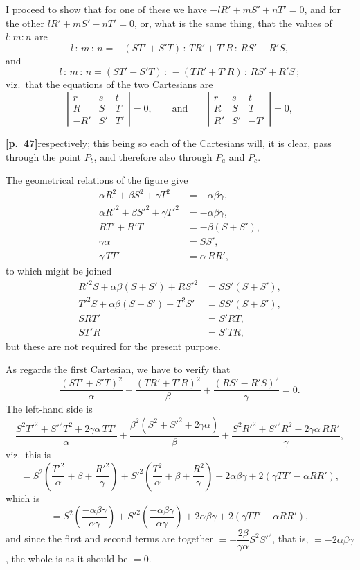 \documentclass[11pt,a4paper]{article}
\begin{document}
I proceed to show that for one of these we have $-lR' + mS' + nT' = 0$, and for the other $lR' + mS' - nT' = 0$, or, what is the same thing, that the values of $l:m:n$ are
\[
l\,:\,m\,:\,n = -(ST' + S'T)\,:\,TR' + T'R\,:\,RS' - R'S,
\]
and
\[
l\,:\,m\,:\,n = (ST' - S'T)\,:\,-(TR' + T'R)\,:\,RS' + R'S\,;
\]
viz.\ that the equations of the two Cartesians are
\[
\left|\begin{array}{ccc} r & s & t \\ R & S & T \\ -R' & S' & T' \end{array}\right| = 0,\qquad\text{and}\qquad
\left|\begin{array}{ccc} r & s & t \\ R & S & T \\ R' & S' & -T' \end{array}\right| = 0,
\]

\bigskip

\noindent\textbf{[p.~47]}\quad respectively; this being so each of the Cartesians will, it is clear, pass through the point $P_{b}$, and therefore also through $P_{a}$ and $P_{c}$.

The geometrical relations of the figure give
\begin{align*}
\alpha R^{2} + \beta S^{2} + \gamma T^{2} &= -\alpha\beta\gamma, \\
\alpha R'^{2} + \beta S'^{2} + \gamma T'^{2} &= -\alpha\beta\gamma, \\
RT' + R'T &= -\beta(S + S'), \\
\gamma\alpha &= SS', \\
\gamma\, TT' &= \alpha\, RR',
\end{align*}
to which might be joined
\begin{align*}
R'^{2}S + \alpha\beta(S + S') + RS'^{2} &= SS'(S + S'), \\
T'^{2}S + \alpha\beta(S + S') + T^{2}S' &= SS'(S + S'), \\
SRT' &= S'RT, \\
ST'R &= S'TR,
\end{align*}
but these are not required for the present purpose.

As regards the first Cartesian, we have to verify that
\[
\frac{(ST' + S'T)^{2}}{\alpha} + \frac{(TR' + T'R)^{2}}{\beta} + \frac{(RS' - R'S)^{2}}{\gamma} = 0.
\]
The left-hand side is
\[
\frac{S^{2}T'^{2} + S'^{2}T^{2} + 2\gamma\alpha\,TT'}{\alpha}
+ \frac{\beta^{2}(S^{2} + S'^{2} + 2\gamma\alpha)}{\beta}
+ \frac{S^{2}R'^{2} + S'^{2}R^{2} - 2\gamma\alpha\,RR'}{\gamma},
\]
viz.\ this is
\[
= S^{2}\!\left(\frac{T'^{2}}{\alpha} + \beta + \frac{R'^{2}}{\gamma}\right)
+ S'^{2}\!\left(\frac{T^{2}}{\alpha} + \beta + \frac{R^{2}}{\gamma}\right)
+ 2\alpha\beta\gamma + 2(\gamma TT' - \alpha RR'),
\]
which is
\[
= S^{2}\!\left(\frac{-\alpha\beta\gamma}{\alpha\gamma}\right) + S'^{2}\!\left(\frac{-\alpha\beta\gamma}{\alpha\gamma}\right) + 2\alpha\beta\gamma + 2(\gamma TT' - \alpha RR'),
\]
and since the first and second terms are together $= -\dfrac{2\beta}{\gamma\alpha}S^{2}S'^{2}$, that is, $= -2\alpha\beta\gamma$, the whole is as it should be $= 0$.
\end{document}
